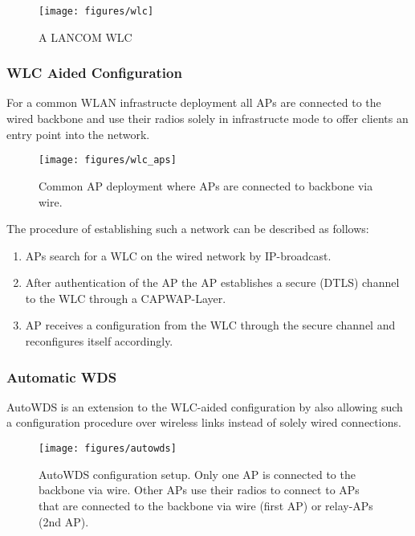 	\begin{figure}[h!]
	  \centering
	  \texttt{[image: figures/wlc]}
	  \caption{A LANCOM \ac{WLC} \cite{lancom}}
	  \label{fig:wlc}
	\end{figure}
	
	\newpage
      
      \subsubsection{WLC Aided Configuration}
	For a common \ac{WLAN} infrastructe deployment all APs are connected to the wired backbone and use their radios solely in infrastructe mode to 
	offer clients an entry point into the network.
	\begin{figure}[h!]
	  \centering
	  \texttt{[image: figures/wlc\_aps]}
	  \caption{Common \ac{AP} deployment where APs are connected to backbone via wire.}
	  \label{fig:wlc_aps}
	\end{figure}
	The procedure of establishing such a network can be described as follows:
	\begin{enumerate}
	 \item APs search for a \ac{WLC} on the wired network by \ac{IP}-broadcast.
	 \item After authentication of the \ac{AP} the \ac{AP} establishes a secure (\ac{DTLS}) channel to the \ac{WLC} through a \ac{CAPWAP}-Layer.
	 \item \ac{AP} receives a configuration from the \ac{WLC} through the secure channel and reconfigures itself accordingly.
	\end{enumerate}
	
      \subsubsection{Automatic \ac{WDS}}
	\label{autowdsbasic}
	AutoWDS is an extension to the \ac{WLC}-aided configuration by also allowing such a configuration procedure over wireless links instead of solely wired connections.
            
	\begin{figure}[h!]
	  \centering
	  \texttt{[image: figures/autowds]}
	  \caption{AutoWDS configuration setup. Only one AP is connected to the backbone via wire. 
	    Other APs use their radios to connect to APs that are connected to the backbone via wire (first \ac{AP}) or relay-APs (2nd \ac{AP}).}
	  \label{fig:autowds}
	\end{figure}
	
